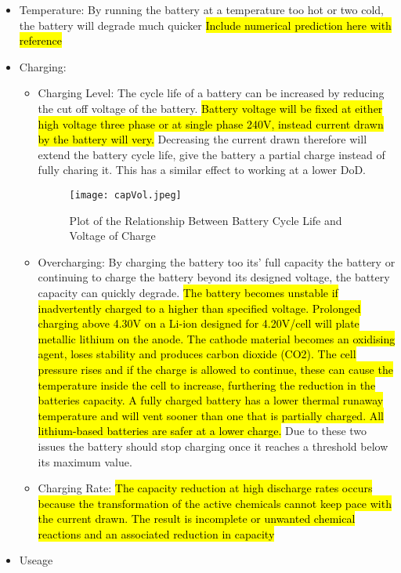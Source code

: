 \begin{itemize}
\item
  Temperature: By running the battery at a temperature too hot or two
  cold, the battery will degrade much quicker
  \hl{Include numerical prediction here with reference}
  \cite{rong2006analytical}
\item
  Charging:

  \begin{itemize}
  \tightlist
  \item
    Charging Level: The cycle life of a battery can be increased by
    reducing the cut off voltage of the battery.
    \hl{Battery voltage will be fixed at either high voltage three phase or at single phase 240V, instead current drawn by the battery will very.}
    Decreasing the current drawn therefore will extend the battery cycle
    life, give the battery a partial charge instead of fully charing it.
    This has a similar effect to working at a lower DoD.
    \cite{Choi2002130}

    \begin{figure}[H]
    \centering
    \texttt{[image: capVol.jpeg]}
    \caption{Plot of the Relationship Between Battery Cycle Life and Voltage of Charge \cite{Choi2002130} }
    \label{capVol}
    \end{figure}
  \item
    Overcharging: By charging the battery too its' full capacity the
    battery or continuing to charge the battery beyond its designed
    voltage, the battery capacity can quickly degrade.
    \hl{The battery becomes unstable if inadvertently charged to a higher than specified voltage. Prolonged charging above 4.30V on a Li-ion designed for 4.20V/cell will plate metallic lithium on the anode. The cathode material becomes an oxidising agent, loses stability and produces carbon dioxide (CO2). The cell pressure rises and if the charge is allowed to continue, these can cause the temperature inside the cell to increase, furthering the reduction in the batteries capacity. A fully charged battery has a lower thermal runaway temperature and will vent sooner than one that is partially charged. All lithium-based batteries are safer at a lower charge.}
    \cite{Charging53:online} Due to these two issues the battery should
    stop charging once it reaches a threshold below its maximum value.
  \item
    Charging Rate:
    \hl{The capacity reduction at high discharge rates occurs because the transformation of the active chemicals cannot keep pace with the current drawn. The result is incomplete or unwanted chemical reactions and an associated reduction in capacity}
    \cite{BatteryL10:online}
  \end{itemize}
\item
  Useage


\end{itemize}
